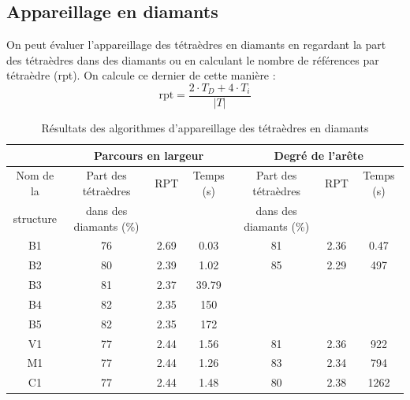 \subsection{Appareillage en diamants}
\noindent
On peut évaluer l'appareillage des tétraèdres en diamants en regardant la part des tétraèdres dans des diamants ou en calculant le nombre de références par tétraèdre (rpt). On calcule ce dernier de cette manière :\\
\begin{equation}
\text{rpt} = \frac{2\cdot T_D+4\cdot T_i}{|T|}
\end{equation}
\begin{table}[H]
\centering
\footnotesize
\begin{tabular}{|c | c | c | c| c | c | c |}
\hline
& \multicolumn{3}{|c|}{Parcours en largeur}& \multicolumn{3}{|c|}{Degré de l'arête}\\
\hline
Nom de la & Part des tétraèdres & RPT & Temps (s) & Part des tétraèdres & RPT & Temps (s)\\
structure&dans des diamants (\%)&&&dans des diamants (\%)&&\\
\hline
B1 & 76 & 2.69 & 0.03 & 81 & 2.36 & 0.47 \\
B2 &  80 & 2.39 & 1.02 & 85 & 2.29 & 497 \\
B3 & 81& 2.37 & 39.79 &  &  &\\
B4 & 82& 2.35 & 150 &  &  &\\
B5 & 82 & 2.35 & 172 &  &  &\\
V1 & 77& 2.44 & 1.56 & 81& 2.36 & 922\\
M1 & 77& 2.44 & 1.26 & 83 & 2.34 & 794\\
C1 & 77& 2.44 & 1.48 & 80 & 2.38 & 1262\\
\hline  
\end{tabular}
\caption{Résultats des algorithmes d'appareillage des tétraèdres en diamants}
\label{tab:results_performances}
\end{table}

